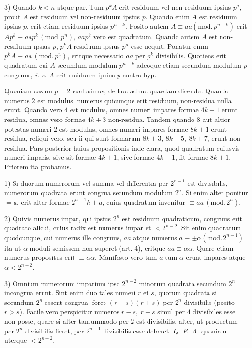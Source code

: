 3) Quando $k<n$ atque par. Tum $p^k A$ erit residuum vel non-residuum ipsius $p^n$, prout $A$ est residuum vel non-residuum ipsius $p$. Quando enim $A$ est residuum ipsius $p$, erit etiam residuum ipsius $p^{n-k}$. Posito autem $A\equiv aa (\mathrm{mod.}\,p^{n-k})$ erit $Ap^k\equiv aap^k\,(\mathrm{mod.}\,p^n)$, $aap^k$ vero est quadratum. Quando autem $A$ est non-residuum ipsius $p$, $p^k A$ residuum ipsius $p^n$ esse nequit. Ponatur enim $p^k A\equiv aa\,(\mathrm{mod.}\,p^n)$, eritque necessario $aa$ per $p^k$ divisibilis. Quotiens erit quadratum cui $A$ secundum modulum $p^{n-k}$ adeoque etiam secundum modulum $p$ congruus, \emph{i. e.} $A$ erit residuum ipsius $p$ contra hyp.


Quoniam casum $p=2$ exclusimus, de hoc adhuc quaedam dicenda. Quando numerus $2$ est modulus, numerus quicunque erit residuum, non-residua nulla erunt. Quando vero $4$ est modulus, omnes numeri impares formae $4k+1$ erunt residua, omnes vero formae $4k+3$ non-residua. Tandem quando $8$ aut altior potestas numeri $2$ est modulus, omnes numeri impares formae $8k+1$ erunt residua, reliqui vero, seu ii qui sunt formarum $8k+3,\ 8k+5,\ 8k+7$, erunt non-residua. Pars posterior huius propositionis inde clara, quod quadratum cuiusvis numeri imparis, sive sit formae $4k+1$, sive formae $4k-1$, fit formae $8k+1$. Priorem ita probamus.

1) Si duorum numerorum vel summa vel differentia per $2^{n-1}$ est divisibilis, numerorum quadrata erunt congrua secundum modulum $2^n$. Si enim alter ponitur $=a$, erit alter formae $2^{n-1}h\pm a$, cuius quadratum invenitur $\equiv aa\,(\mathrm{mod.}\,2^n)$.

2) Quivis numerus impar, qui ipsius $2^n$ est residuum quadraticum, congruus erit quadrato alicui, cuius radix est numerus impar et $<2^{n-2}$. Sit enim quadratum quodcunque, cui numerus ille congruus, $aa$ atque numerus $a\equiv\pm\alpha (\mathrm{mod.}\,2^{n-1})$ ita ut $\alpha$ moduli semissem non superet (art. 4), eritque $aa\equiv\alpha\alpha$. Quare etiam numerus propositus erit $\equiv\alpha\alpha$. Manifesto vero tum $a$ tum $\alpha$ erunt impares atque $\alpha<2^{n-2}$.

3) Omnium numerorum imparium ipso $2^{n-2}$ minorum quadrata secundum $2^n$ incongrua erunt. Sint enim duo tales numeri $r$ et $s$, quorum quadrata si secundum $2^n$ essent congrua, foret $(r-s)(r+s)$ per $2^n$ divisibilis (posito $r>s$). Facile vero perspicitur numeros $r-s,\ r+s$ simul per $4$ divisibiles esse non
posse, quare si alter tantummodo per $2$ est divisibilis, alter, ut productum per $2^n$ divisibilis fieret, per $2^{n-1}$ divisibilis esse deberet. \emph{Q. E. A.} quoniam uterque $<2^{n-2}$.

